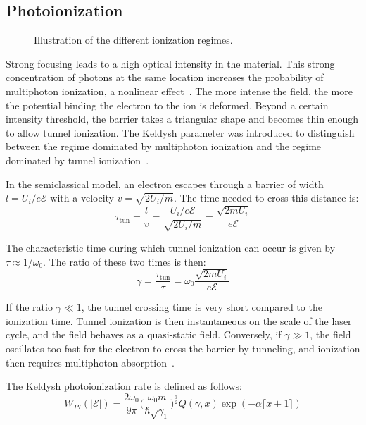 \subsection{Photoionization}

\begin{figure}[htbp]
    \centering
    \resizebox{\textwidth}{!}{}
    \caption{Illustration of the different ionization regimes.}
    \label{fig:regimes_ionisation}
\end{figure}

Strong focusing leads to a high optical intensity in the material. This strong concentration of photons at the same location increases the probability of multiphoton ionization, a nonlinear effect~\cite{mao2004}. The more intense the field, the more the potential binding the electron to the ion is deformed. Beyond a certain intensity threshold, the barrier takes a triangular shape and becomes thin enough to allow tunnel ionization. The Keldysh parameter was introduced to distinguish between the regime dominated by multiphoton ionization and the regime dominated by tunnel ionization~\cite{mao2004}.

In the semiclassical model, an electron escapes through a barrier of width $l = U_i/e\mathcal{E}$ with a velocity $v = \sqrt{2U_i/m}$. The time needed to cross this distance is:
\begin{equation}
\tau_{\text{tun}} = \frac{l}{v} = \frac{U_i/e\mathcal{E}}{\sqrt{2U_i/m}} = \frac{\sqrt{2m U_i}}{e\mathcal{E}}
\end{equation}

The characteristic time during which tunnel ionization can occur is given by $\tau \approx 1/\omega_0$. The ratio of these two times is then:
\begin{equation}
\gamma = \frac{\tau_{\text{tun}}}{\tau} = \omega_0\frac{\sqrt{2m U_i}}{e\mathcal{E}}
\end{equation}

If the ratio $\gamma \ll 1$, the tunnel crossing time is very short compared to the ionization time. Tunnel ionization is then instantaneous on the scale of the laser cycle, and the field behaves as a quasi-static field. Conversely, if $\gamma \gg 1$, the field oscillates too fast for the electron to cross the barrier by tunneling, and ionization then requires multiphoton absorption~\cite{bulgakova2010}.

The Keldysh photoionization rate is defined as follows:
\begin{equation}
W_{PI}(|\mathcal{E}|) = \frac{2\omega_0}{9\pi}\bigg(\frac{\omega_0m}{\hbar\sqrt{\gamma_1}}\bigg)^{\frac{3}{2}}Q(\gamma,x)\exp(-\alpha\lceil x+1\rceil)
\end{equation}

